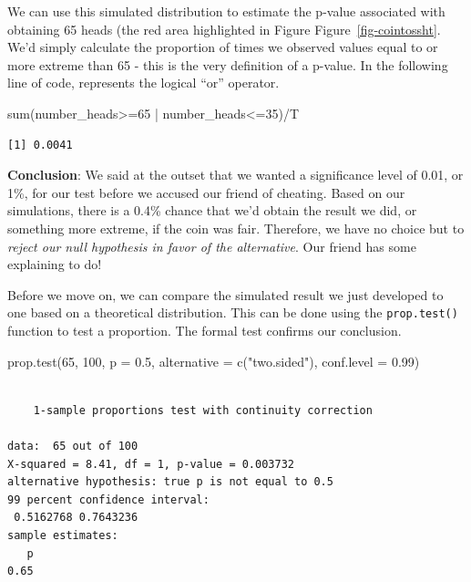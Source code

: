 \documentclass[
  letterpaper,
  DIV=11,
  numbers=noendperiod]{scrreprt}
\newenvironment{Shaded}{\begin{snugshade}}{\end{snugshade}}
\newcommand{\AttributeTok}[1]{\textcolor[rgb]{0.40,0.45,0.13}{#1}}
\newcommand{\DecValTok}[1]{\textcolor[rgb]{0.68,0.00,0.00}{#1}}
\newcommand{\FloatTok}[1]{\textcolor[rgb]{0.68,0.00,0.00}{#1}}
\newcommand{\FunctionTok}[1]{\textcolor[rgb]{0.28,0.35,0.67}{#1}}
\newcommand{\NormalTok}[1]{\textcolor[rgb]{0.00,0.23,0.31}{#1}}
\newcommand{\SpecialCharTok}[1]{\textcolor[rgb]{0.37,0.37,0.37}{#1}}
\newcommand{\StringTok}[1]{\textcolor[rgb]{0.13,0.47,0.30}{#1}}
\begin{document}
We can use this simulated distribution to estimate the p-value
associated with obtaining 65 heads (the red area highlighted in Figure
Figure~\ref{fig-cointossht}. We'd simply calculate the proportion of
times we observed values equal to or more extreme than 65 - this is the
very definition of a p-value. In the following line of code,
\texttt{\textbar{}} represents the logical ``or'' operator.

\begin{Shaded}
\begin{Highlighting}[]
\FunctionTok{sum}\NormalTok{(number\_heads}\SpecialCharTok{\textgreater{}=}\DecValTok{65} \SpecialCharTok{|}\NormalTok{ number\_heads}\SpecialCharTok{\textless{}=}\DecValTok{35}\NormalTok{)}\SpecialCharTok{/}\NormalTok{T}
\end{Highlighting}
\end{Shaded}

\begin{verbatim}
[1] 0.0041
\end{verbatim}

\textbf{Conclusion}: We said at the outset that we wanted a significance
level of 0.01, or 1\%, for our test before we accused our friend of
cheating. Based on our simulations, there is a 0.4\% chance that we'd
obtain the result we did, or something more extreme, if the coin was
fair. Therefore, we have no choice but to \emph{reject our null
hypothesis in favor of the alternative}. Our friend has some explaining
to do!

Before we move on, we can compare the simulated result we just developed
to one based on a theoretical distribution. This can be done using the
\texttt{prop.test()} function to test a proportion. The formal test
confirms our conclusion.

\begin{Shaded}
\begin{Highlighting}[]
\FunctionTok{prop.test}\NormalTok{(}\DecValTok{65}\NormalTok{, }\DecValTok{100}\NormalTok{, }\AttributeTok{p =} \FloatTok{0.5}\NormalTok{,}
           \AttributeTok{alternative =} \FunctionTok{c}\NormalTok{(}\StringTok{"two.sided"}\NormalTok{),}
           \AttributeTok{conf.level =} \FloatTok{0.99}\NormalTok{)}
\end{Highlighting}
\end{Shaded}

\begin{verbatim}

    1-sample proportions test with continuity correction

data:  65 out of 100
X-squared = 8.41, df = 1, p-value = 0.003732
alternative hypothesis: true p is not equal to 0.5
99 percent confidence interval:
 0.5162768 0.7643236
sample estimates:
   p 
0.65 
\end{verbatim}
\end{document}
